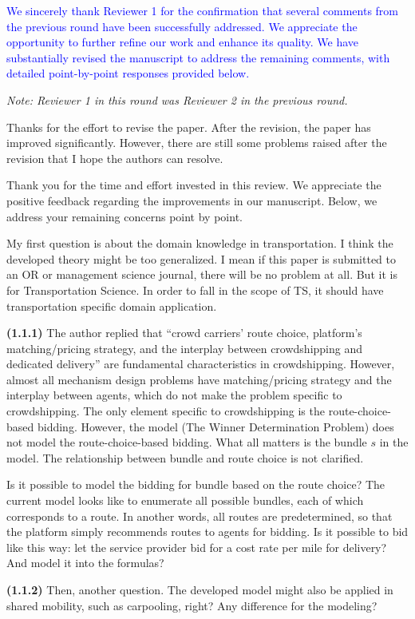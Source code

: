 \reviewer
\medskip
\textcolor{blue}{We sincerely thank Reviewer 1 for the confirmation that several comments from the previous round have been successfully addressed. We appreciate the opportunity to further refine our work and enhance its quality. We have substantially revised the manuscript to address the remaining comments, with detailed point-by-point responses provided below.} 

\noindent \textit{Note: Reviewer 1 in this round was Reviewer 2 in the previous round.}
\medskip

\begin{revcomment}[1.0]
	Thanks for the effort to revise the paper. After the revision, the paper has improved significantly. However, there are still some problems raised after the revision that I hope the authors can resolve. 
\end{revcomment}

\hypertarget{Response to R1}{}
\begin{revresponse}[1.0]
    Thank you for the time and effort invested in this review. We appreciate the positive feedback regarding the improvements in our manuscript. Below, we address your remaining concerns point by point. 
\end{revresponse}

\begin{revcomment}[1.1]
	My first question is about the domain knowledge in transportation. I think the developed theory might be too generalized. I mean if this paper is submitted to an OR or management science journal, there will be no problem at all. But it is for Transportation Science. In order to fall in the scope of TS, it should have transportation specific domain application. 
    
    \textbf{(1.1.1)} The author replied that ``crowd carriers' route choice, platform's matching/pricing strategy, and the interplay between crowdshipping and dedicated delivery'' are fundamental characteristics in crowdshipping. However, almost all mechanism design problems have matching/pricing strategy and the interplay between agents, which do not make the problem specific to crowdshipping. The only element specific to crowdshipping is the route-choice-based bidding. However, the model (The Winner Determination Problem) does not model the route-choice-based bidding. What all matters is the bundle $s$ in the model. The relationship between bundle and route choice is not clarified. 
    
    \quad Is it possible to model the bidding for bundle based on the route choice? The current model looks like to enumerate all possible bundles, each of which corresponds to a route. In another words, all routes are predetermined, so that the platform simply recommends routes to agents for bidding. Is it possible to bid like this way: let the service provider bid for a cost rate per mile for delivery? And model it into the formulas?
    
    \textbf{(1.1.2)} Then, another question. The developed model might also be applied in shared mobility, such as carpooling, right? Any difference for the modeling? 
\end{revcomment}

